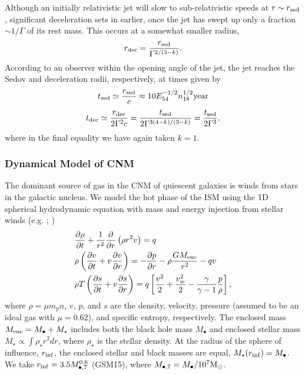 \documentclass[usenatbib,fleqn]{mnras}
\newcommand{\Mbh}[1][]{M_{\bullet#1}}
\newcommand{\Menc}{M_{\rm enc}}
\newcommand{\Msun}{{\rm M_\odot}}
\begin{document}
Although an initially relativistic jet will slow to sub-relativistic
speeds at $r \sim r_{\rm sed}$, significant deceleration sets in
earlier, once the jet has swept up only a fraction $\sim 1/\Gamma$ of
its rest mass.  This occurs at a somewhat smaller radius,
\begin{equation}
  r_{\rm dec}=\frac{r_{\rm sed}}{\Gamma^{2/(3-k)}}.
  \label{eq:rdec2}
\end{equation}
According to an observer within the opening angle of the jet, the jet
reaches the Sedov and deceleration radii, respectively, at times given
by
\begin{equation}
t_{\rm sed} \simeq \frac{r_{\rm sed}}{c} \approx
10 E_{54}^{-1/2}n_{18}^{1/2} {\rm year}
 \end{equation} 
\begin{equation}
t_{\rm dec} \simeq
\frac{r_{\rm dec}}{2\Gamma^{2} c} = \frac{t_{\rm
    sed}}{2\Gamma^{3(4-k)/(3-k)}} = \frac{t_{\rm sed}}{2\Gamma^{3}},
 \label{eq:tdec}
\end{equation}
%
where in the final equality we have again taken $k = 1$.


\subsubsection{Dynamical Model of CNM}
\label{sec:model}

The dominant source of gas in the CNM of quiescent galaxies is winds
from stars in the galactic nucleus. We model the hot phase of the ISM
using the 1D spherical hydrodynamic equation with mass and energy
injection from stellar winds (e.g. \citealt{Holzer+1970};
\citealt{Quataert2004})
\begin{align}
  &\frac{\partial \rho}{\partial t}+\frac{1}{r^2}\frac{\partial}{\partial r}\left(\rho r^2 v\right)=q \label{eq:drhodt}\\
  &\rho \left(\frac{\partial v}{\partial t} + v\frac{\partial
      v}{\partial r}\right) =-\frac{\partial p}{\partial r}- \rho\frac{GM_{\rm enc}}{r^{2}} -q v \label{eq:dvdt}\\
  &\rho T\left(\frac{\partial s}{\partial t} + v\frac{\partial
      s}{\partial
      r}\right)=q\left[\frac{v^2}{2}+\frac{v_w^2}{2}-\frac{\gamma}{\gamma-1}
    \frac{p}{\rho} \right] ,
\label{eq:model}
\end{align}
where $\rho = \mu m_p n$, $v$, $p$, and $s$ are the density, velocity,
pressure (assumed to be an ideal gas with $\mu = 0.62$), and specific
entropy, respectively.  The enclosed mass $\Menc = M_{\bullet} +
M_{\star}$ includes both the black hole mass $M_{\bullet}$ and
enclosed stellar mass $M_{\star} \propto \int \rho_{\star}r^{2}dr$,
where $\rho_{\star}$ is the stellar density. At the radius of the
sphere of influence, $r_{\rm inf}$, the enclosed stellar and black
masses are equal, $M_{\star}(r_{\rm inf})=\Mbh$.  We take $r_{\rm
  inf}=3.5 \Mbh[,7]^{0.6}$ (GSM15), where $\Mbh[,7]=\Mbh/10^7 \Msun$.
\end{document}
